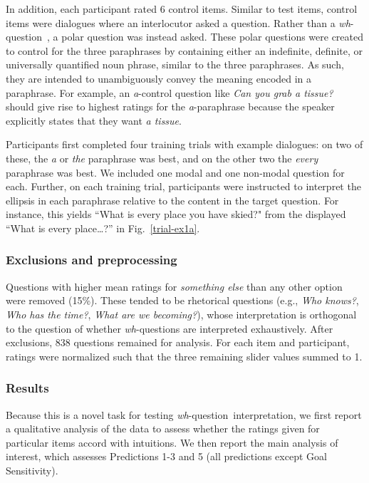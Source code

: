 \documentclass[12pt,letterpaper,table,svgnames,dvipsnames]{article}
\newcommand{\figref}[1]{Fig.~\ref{#1}}
\newcommand{\whq}{\emph{wh}-question~}
\begin{document}
In addition, each participant rated 6 control items. Similar to test items, control items were dialogues where an interlocutor asked a question. Rather than a \whq, a polar question was instead asked. These polar questions were created to control for the three paraphrases by containing either an indefinite, definite, or universally quantified noun phrase, similar to the three paraphrases. As such, they are intended to unambiguously convey the meaning encoded in a paraphrase. For example, an \emph{a}-control question like \emph{Can you grab a tissue?} should give rise to highest ratings for the \emph{a}-paraphrase because the speaker explicitly states that they want \emph{a tissue}.
    

Participants first completed four training trials with example dialogues: on two of these, the \emph{a} or \emph{the} paraphrase was best, and on the other two the \emph{every} paraphrase was best. We included one modal and one non-modal question for each. Further, on each training trial, participants were instructed to interpret the ellipsis in each paraphrase relative to the content in the target question. For instance, this yields ``What is every place you have skied?" from the displayed ``What is every place\dots?'' in \figref{trial-ex1a}.

\subsubsection{Exclusions and preprocessing}
Questions with higher mean ratings for \emph{something else} than any other option were removed (15\%). These tended to be rhetorical questions (e.g., \emph{Who knows?}, \emph{Who has the time?}, \emph{What are we becoming?}), whose interpretation is orthogonal to the question of whether \emph{wh}-questions are interpreted exhaustively. After exclusions, 838 questions remained for analysis. For each item and participant, ratings were normalized such that the three remaining slider values summed to 1.  

\subsubsection{Results}
Because this is a novel task for testing \whq interpretation, we first report a qualitative analysis of the data to assess whether the ratings given for particular items accord with intuitions. We then report the main analysis of interest, which assesses Predictions 1-3 and 5 (all predictions except Goal Sensitivity). 
\end{document}
